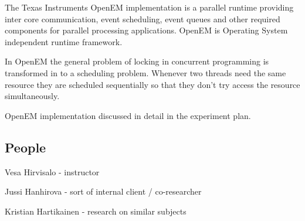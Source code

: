 The Texas Instruments OpenEM implementation is a parallel runtime providing inter core communication, event scheduling, event queues and other required components for parallel processing applications. OpenEM is Operating System independent runtime framework.

In OpenEM the general problem of locking in concurrent programming is transformed in to a scheduling problem. Whenever two threads need the same resource they are scheduled sequentially so that they don't try access the resource simultaneously.

OpenEM implementation discussed in detail in the experiment plan.
\subsection{People}
Vesa Hirvisalo - instructor

Jussi Hanhirova - sort of internal client / co-researcher

Kristian Hartikainen - research on similar subjects